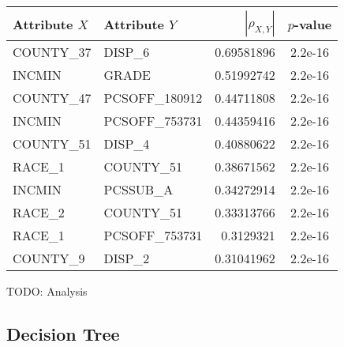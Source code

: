 \documentclass[]{article}
\begin{document}
\begin{tabular}{|l|l|r|c|}
\hline
Attribute $X$ & Attribute $Y$ & $|\rho_{X,Y}|$ & $p$-value \\
\hline
COUNTY\_37&	DISP\_6&	0.69581896 & 2.2e-16\\
INCMIN&	GRADE&	0.51992742 & 2.2e-16\\
COUNTY\_47&	PCSOFF\_180912&	0.44711808 & 2.2e-16\\
INCMIN&	PCSOFF\_753731&	0.44359416 & 2.2e-16\\
COUNTY\_51&	DISP\_4&	0.40880622 & 2.2e-16\\
RACE\_1&	COUNTY\_51&	0.38671562 & 2.2e-16\\
INCMIN&	PCSSUB\_A&	0.34272914 & 2.2e-16\\
RACE\_2&	COUNTY\_51&	0.33313766 & 2.2e-16\\
RACE\_1&	PCSOFF_753731&	0.3129321 & 2.2e-16\\
COUNTY\_9&	DISP\_2&	0.31041962 & 2.2e-16\\
\hline
\end{tabular}

TODO: Analysis

\subsection{Decision Tree}
\end{document}
